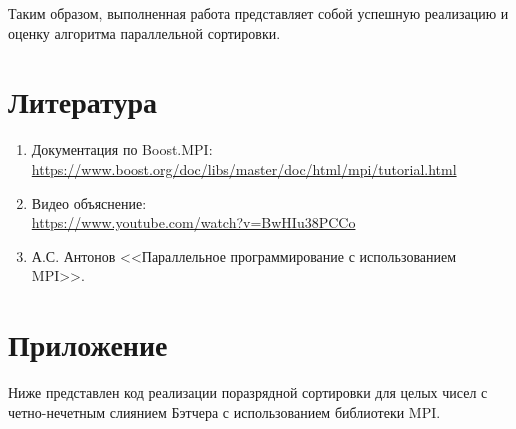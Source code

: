 \documentclass[12pt]{article}
\begin{document}
Таким образом, выполненная работа представляет собой успешную реализацию и оценку алгоритма параллельной сортировки.

\section{Литература}
\begin{enumerate}
    \item Документация по Boost.MPI:\\ \url{https://www.boost.org/doc/libs/master/doc/html/mpi/tutorial.html}
    \item Видео объяснение:\\ 
    \url{https://www.youtube.com/watch?v=BwHIu38PCCo}
    \item {А.С. Антонов <<Параллельное программирование с использованием MPI>>}.
\end{enumerate}

\section{Приложение}

Ниже представлен код реализации поразрядной сортировки для целых чисел с четно-нечетным слиянием Бэтчера с использованием библиотеки MPI.
\end{document}
